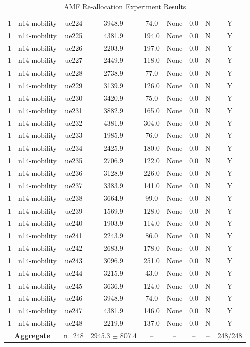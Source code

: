 \begin{table}[ht]
\begin{tabular}{|c|c|c|c|c|c|c|c|c|}
1 & n14-mobility & ue224 & 3948.9 & 74.0 & None & 0.0 & N & Y \\
1 & n14-mobility & ue225 & 4381.9 & 194.0 & None & 0.0 & N & Y \\
1 & n14-mobility & ue226 & 2203.9 & 197.0 & None & 0.0 & N & Y \\
1 & n14-mobility & ue227 & 2449.9 & 118.0 & None & 0.0 & N & Y \\
1 & n14-mobility & ue228 & 2738.9 & 77.0 & None & 0.0 & N & Y \\
1 & n14-mobility & ue229 & 3139.9 & 126.0 & None & 0.0 & N & Y \\
1 & n14-mobility & ue230 & 3420.9 & 75.0 & None & 0.0 & N & Y \\
1 & n14-mobility & ue231 & 3882.9 & 165.0 & None & 0.0 & N & Y \\
1 & n14-mobility & ue232 & 4381.9 & 304.0 & None & 0.0 & N & Y \\
1 & n14-mobility & ue233 & 1985.9 & 76.0 & None & 0.0 & N & Y \\
1 & n14-mobility & ue234 & 2425.9 & 180.0 & None & 0.0 & N & Y \\
1 & n14-mobility & ue235 & 2706.9 & 122.0 & None & 0.0 & N & Y \\
1 & n14-mobility & ue236 & 3128.9 & 226.0 & None & 0.0 & N & Y \\
1 & n14-mobility & ue237 & 3383.9 & 141.0 & None & 0.0 & N & Y \\
1 & n14-mobility & ue238 & 3664.9 & 99.0 & None & 0.0 & N & Y \\
1 & n14-mobility & ue239 & 1569.9 & 128.0 & None & 0.0 & N & Y \\
1 & n14-mobility & ue240 & 1903.9 & 114.0 & None & 0.0 & N & Y \\
1 & n14-mobility & ue241 & 2243.9 & 86.0 & None & 0.0 & N & Y \\
1 & n14-mobility & ue242 & 2683.9 & 178.0 & None & 0.0 & N & Y \\
1 & n14-mobility & ue243 & 3096.9 & 251.0 & None & 0.0 & N & Y \\
1 & n14-mobility & ue244 & 3215.9 & 43.0 & None & 0.0 & N & Y \\
1 & n14-mobility & ue245 & 3636.9 & 124.0 & None & 0.0 & N & Y \\
1 & n14-mobility & ue246 & 3948.9 & 74.0 & None & 0.0 & N & Y \\
1 & n14-mobility & ue247 & 4381.9 & 146.0 & None & 0.0 & N & Y \\
1 & n14-mobility & ue248 & 2219.9 & 137.0 & None & 0.0 & N & Y \\
\multicolumn{2}{|c|}{\textbf{Aggregate}} & n=248 & 2945.3 $\pm$ 807.4 & -- & -- & -- & -- & 248/248 \\
\hline
\end{tabular}
\caption{AMF Re-allocation Experiment Results}
\label{tab:amf_realloc}
\end{table}
